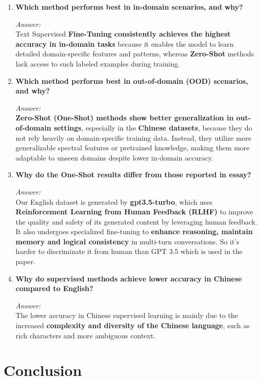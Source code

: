 \documentclass[lettersize,journal]{IEEEtran}
\begin{document}
\begin{enumerate}
    \item \textbf{Which method performs best in in-domain scenarios, and why?}
    
    \textit{Answer:} \\
   Text Supervised \textbf{Fine-Tuning consistently achieves the highest accuracy in in-domain tasks} because it enables the model to learn detailed domain-specific features and patterns, whereas \textbf{Zero-Shot} methods lack access to such labeled examples during training.
 
    \item \textbf{Which method performs best in out-of-domain (OOD) scenarios, and why?}
    
    \textit{Answer:} \\
    \textbf{Zero-Shot (One-Shot) methods show better generalization in out-of-domain settings}, especially in the \textbf{Chinese datasets}, because they do not rely heavily on domain-specific training data. Instead, they utilize more generalizable spectral features or pretrained knowledge, making them more adaptable to unseen domains despite lower in-domain accuracy.

   \item \textbf{Why do the One-Shot results differ from those reported in essay?}
   
    \textit{Answer:} \\
 Our English dataset is generated by \textbf{gpt3.5-turbo}, which uses \textbf{Reinforcement Learning from Human Feedback (RLHF)} to improve the quality and safety of its generated content by leveraging human feedback. It also undergoes specialized fine-tuning to \textbf{enhance reasoning,  maintain memory and logical consistency} in multi-turn conversations. So it's harder to discriminate it from human than GPT 3.5 which is used in the paper.
    \vspace{0.3cm}
    \item \textbf{Why do supervised methods achieve lower accuracy in Chinese compared to English?}
    
    \textit{Answer:} \\
    The lower accuracy in Chinese supervised learning is mainly due to the increased \textbf{complexity and diversity of the Chinese language}, such as rich characters and more ambiguous context. 
    \end{enumerate}



\section{Conclusion}
\end{document}
